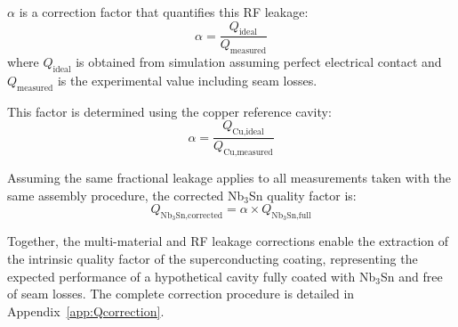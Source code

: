     $\alpha$ is a correction factor that quantifies this RF leakage:
    \begin{equation}
        \alpha = \frac{Q_\text{ideal}}{Q_\text{measured}}
        \label{eq:alpha_def}
    \end{equation}
    where $Q_\text{ideal}$ is obtained from simulation assuming perfect electrical contact and $Q_\text{measured}$ is the experimental value including seam losses.
    
    This factor is determined using the copper reference cavity:
    \begin{equation}
        \alpha = \frac{Q_\text{Cu,ideal}}{Q_\text{Cu,measured}}
        \label{eq:alpha_Cu}
    \end{equation}
    
    Assuming the same fractional leakage applies to all measurements taken with the same assembly procedure, the corrected Nb$_3$Sn quality factor is:
    \begin{equation}
        Q_{\text{Nb}_3\text{Sn,corrected}} = \alpha \times Q_{\text{Nb}_3\text{Sn,full}}
        \label{eq:Q_corrected}
    \end{equation}
    
    Together, the multi-material and RF leakage corrections enable the extraction of the intrinsic quality factor of the superconducting coating, representing the expected performance of a hypothetical cavity fully coated with Nb$_3$Sn and free of seam losses. The complete correction procedure is detailed in Appendix~\ref{app:Qcorrection}.
    
    
    
    


